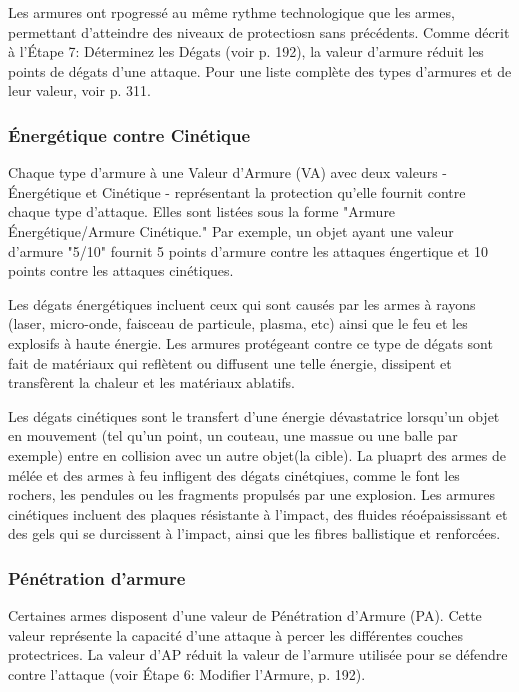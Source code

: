 \label{sec:combat-armor} 

Les armures ont rpogressé au même rythme technologique que les armes, permettant d'atteindre des niveaux de protectiosn sans précédents. Comme décrit à l'Étape 7: Déterminez les Dégats (voir p. 192), la valeur d'armure réduit les points de dégats d'une attaque. Pour une liste complète des types d'armures et de leur valeur, voir p. 311. 

\subsubsection{Énergétique contre Cinétique} 

Chaque type d'armure à une Valeur d'Armure (VA) avec deux valeurs - Énergétique et Cinétique - représentant la protection qu'elle fournit contre chaque type d'attaque. Elles sont listées sous la forme "Armure Énergétique/Armure Cinétique." Par exemple, un objet ayant une valeur d'armure "5/10" fournit 5 points d'armure contre les attaques éngertique et 10 points contre les attaques cinétiques. 

Les dégats énergétiques incluent ceux qui sont causés par les armes à rayons (laser, micro-onde, faisceau de particule, plasma, etc) ainsi que le feu et les explosifs à haute énergie. Les armures protégeant contre ce type de dégats sont fait de matériaux qui reflètent ou diffusent une telle énergie, dissipent et transfèrent la chaleur et les matériaux ablatifs. 

Les dégats cinétiques sont le transfert d'une énergie dévastatrice lorsqu'un objet en mouvement (tel qu'un point, un couteau, une massue ou une balle par exemple) entre en collision avec un autre objet(la cible). La pluaprt des armes de mélée et des armes à feu infligent des dégats cinétqiues, comme le font les rochers, les pendules ou les fragments propulsés par une explosion. Les armures cinétiques incluent des plaques résistante à l'impact, des fluides réoépaississant et des gels qui se durcissent à l'impact, ainsi que les fibres ballistique et renforcées. 

\subsubsection{Pénétration d'armure} 

Certaines armes disposent d'une valeur de Pénétration d'Armure (PA). Cette valeur représente la capacité d'une attaque à percer les différentes couches protectrices. La valeur d'AP réduit la valeur de l'armure utilisée pour se défendre contre l'attaque (voir Étape 6: Modifier l'Armure, p. 192). 

